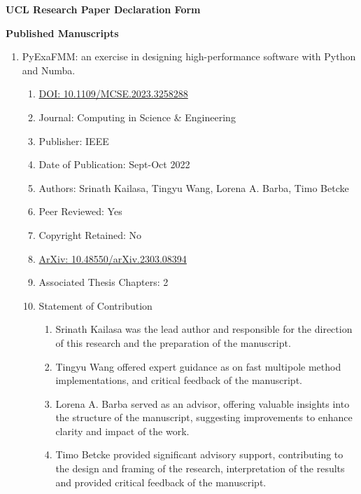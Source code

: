 \thispagestyle{plain}

\begin{center}
    \textbf{UCL Research Paper Declaration Form}
\end{center}

\textbf{Published Manuscripts}

\begin{enumerate}
    \item PyExaFMM: an exercise in designing high-performance software with Python and Numba.
    \begin{enumerate}[label=\alph*)]
      \item \href{https://ieeexplore.ieee.org/document/10124108}{DOI: 10.1109/MCSE.2023.3258288}
      \item Journal: Computing in Science \& Engineering
      \item Publisher: IEEE
      \item Date of Publication: Sept-Oct 2022
      \item Authors: Srinath Kailasa, Tingyu Wang, Lorena A. Barba, Timo Betcke
      \item Peer Reviewed: Yes
      \item Copyright Retained: No
      \item \href{https://doi.org/10.48550/arXiv.2303.08394}{ArXiv: 10.48550/arXiv.2303.08394}
      \item Associated Thesis Chapters: 2
      \item Statement of Contribution
      \begin{enumerate}
        \item Srinath Kailasa was the lead author and responsible for the direction of this research and the preparation of the manuscript.
        \item Tingyu Wang offered expert guidance as on fast multipole method implementations, and critical feedback of the manuscript.
        \item Lorena A. Barba served as an advisor, offering valuable insights into the structure of the manuscript, suggesting improvements to enhance clarity and impact of the work.
        \item Timo Betcke provided significant advisory support, contributing to the design and framing of the research, interpretation of the results and provided critical feedback of the manuscript.
      \end{enumerate}
    \end{enumerate}
\end{enumerate}

